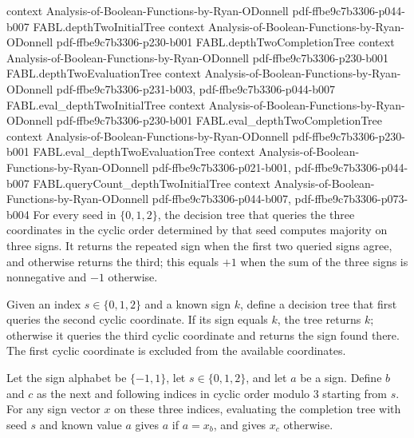 \begin{theorem}
  {context}
  {Analysis-of-Boolean-Functions-by-Ryan-ODonnell}
  {pdf-ffbe9c7b3306-p044-b007}
\proofstep
  {FABL.depthTwoInitialTree}
  {context}
  {Analysis-of-Boolean-Functions-by-Ryan-ODonnell}
  {pdf-ffbe9c7b3306-p230-b001}
\proofstep
  {FABL.depthTwoCompletionTree}
  {context}
  {Analysis-of-Boolean-Functions-by-Ryan-ODonnell}
  {pdf-ffbe9c7b3306-p230-b001}
\proofstep
  {FABL.depthTwoEvaluationTree}
  {context}
  {Analysis-of-Boolean-Functions-by-Ryan-ODonnell}
  {pdf-ffbe9c7b3306-p231-b003,
    pdf-ffbe9c7b3306-p044-b007}
\proofstep
  {FABL.eval_depthTwoInitialTree}
  {context}
  {Analysis-of-Boolean-Functions-by-Ryan-ODonnell}
  {pdf-ffbe9c7b3306-p230-b001}
\proofstep
  {FABL.eval_depthTwoCompletionTree}
  {context}
  {Analysis-of-Boolean-Functions-by-Ryan-ODonnell}
  {pdf-ffbe9c7b3306-p230-b001}
\proofstep
  {FABL.eval_depthTwoEvaluationTree}
  {context}
  {Analysis-of-Boolean-Functions-by-Ryan-ODonnell}
  {pdf-ffbe9c7b3306-p021-b001,
    pdf-ffbe9c7b3306-p044-b007}
\proofstep
  {FABL.queryCount_depthTwoInitialTree}
  {context}
  {Analysis-of-Boolean-Functions-by-Ryan-ODonnell}
  {pdf-ffbe9c7b3306-p044-b007,
    pdf-ffbe9c7b3306-p073-b004}
For every seed in $\{0,1,2\}$, the decision tree that queries the three coordinates in
the cyclic order determined by that seed computes majority on three signs. It returns
the repeated sign when the first two queried signs agree, and otherwise returns the
third; this equals $+1$ when the sum of the three signs is nonnegative and $-1$
otherwise.
\end{theorem}

\begin{definition}
\label{FABL.majorityThreeCyclicCompletionTree}
\leanok
{}
Given an index $s\in\{0,1,2\}$ and a known sign $k$, define a decision tree that first
queries the second cyclic coordinate. If its sign equals $k$, the tree returns $k$;
otherwise it queries the third cyclic coordinate and returns the sign found there. The
first cyclic coordinate is excluded from the available coordinates.
\end{definition}

\begin{theorem}
\label{FABL.eval_majorityThreeCyclicCompletionTree}
\leanok
{}
Let the sign alphabet be $\{-1,1\}$, let $s\in\{0,1,2\}$, and let $a$ be a sign. Define
$b$ and $c$ as the next and following indices in cyclic order modulo $3$ starting from
$s$. For any sign vector $x$ on these three indices, evaluating the completion tree with
seed $s$ and known value $a$ gives $a$ if $a=x_b$, and gives $x_c$ otherwise.
\end{theorem}

